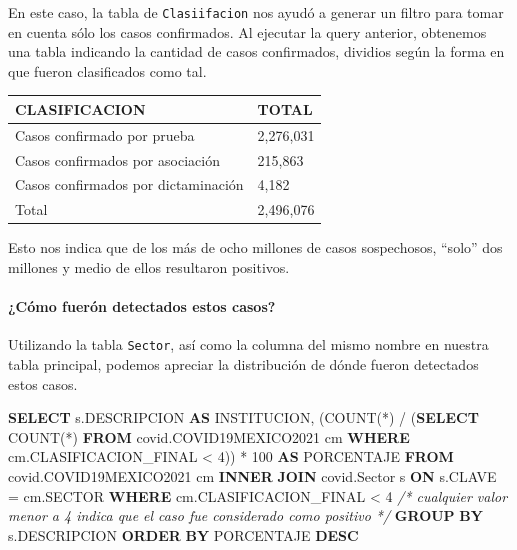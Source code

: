 \documentclass[11pt]{article}
\newenvironment{Shaded}{}{}
\newcommand{\KeywordTok}[1]{\textcolor[rgb]{0.00,0.44,0.13}{\textbf{{#1}}}}
\newcommand{\DecValTok}[1]{\textcolor[rgb]{0.25,0.63,0.44}{{#1}}}
\newcommand{\CommentTok}[1]{\textcolor[rgb]{0.38,0.63,0.69}{\textit{{#1}}}}
\newcommand{\FunctionTok}[1]{\textcolor[rgb]{0.02,0.16,0.49}{{#1}}}
\newcommand{\NormalTok}[1]{{#1}}
\newcommand{\OperatorTok}[1]{\textcolor[rgb]{0.40,0.40,0.40}{{#1}}}
\begin{document}
En este caso, la tabla de \texttt{Clasiifacion} nos ayudó a generar un
filtro para tomar en cuenta sólo los casos confirmados. Al ejecutar la
query anterior, obtenemos una tabla indicando la cantidad de casos
confirmados, dividios según la forma en que fueron clasificados como
tal.

\begin{longtable}[]{@{}ll@{}}
\toprule\noalign{}
CLASIFICACION & TOTAL \\
\midrule\noalign{}
\endhead
\bottomrule\noalign{}
\endlastfoot
Casos confirmado por prueba & 2,276,031 \\
Casos confirmados por asociación & 215,863 \\
Casos confirmados por dictaminación & 4,182 \\
Total & 2,496,076 \\
\end{longtable}

Esto nos indica que de los más de ocho millones de casos sospechosos,
``solo'' dos millones y medio de ellos resultaron positivos.

\hypertarget{cuxf3mo-fueruxf3n-detectados-estos-casos}{%
\paragraph{\texorpdfstring{\textbf{¿Cómo fuerón detectados estos
casos?}}{¿Cómo fuerón detectados estos casos?}}\label{cuxf3mo-fueruxf3n-detectados-estos-casos}}

Utilizando la tabla \texttt{Sector}, así como la columna del mismo
nombre en nuestra tabla principal, podemos apreciar la distribución de
dónde fueron detectados estos casos.

\begin{Shaded}
\begin{Highlighting}[]
\KeywordTok{SELECT}
\NormalTok{    s.DESCRIPCION  }\KeywordTok{AS}\NormalTok{ INSTITUCION,}
\NormalTok{    (}\FunctionTok{COUNT}\NormalTok{(}\OperatorTok{*}\NormalTok{) }\OperatorTok{/}\NormalTok{ (}\KeywordTok{SELECT} \FunctionTok{COUNT}\NormalTok{(}\OperatorTok{*}\NormalTok{) }\KeywordTok{FROM}\NormalTok{ covid.COVID19MEXICO2021 cm }\KeywordTok{WHERE}\NormalTok{ cm.CLASIFICACION\_FINAL }\OperatorTok{\textless{}} \DecValTok{4}\NormalTok{)) }\OperatorTok{*} \DecValTok{100} \KeywordTok{AS}\NormalTok{ PORCENTAJE}
\KeywordTok{FROM} 
\NormalTok{    covid.COVID19MEXICO2021 cm}
\KeywordTok{INNER} \KeywordTok{JOIN} 
\NormalTok{    covid.Sector s  }\KeywordTok{ON}\NormalTok{ s.CLAVE }\OperatorTok{=}\NormalTok{ cm.SECTOR  }
\KeywordTok{WHERE} 
\NormalTok{    cm.CLASIFICACION\_FINAL }\OperatorTok{\textless{}} \DecValTok{4} \CommentTok{/* cualquier valor menor a 4 indica que el caso fue considerado como positivo */}
\KeywordTok{GROUP} \KeywordTok{BY}
\NormalTok{    s.DESCRIPCION }
\KeywordTok{ORDER} \KeywordTok{BY}
\NormalTok{    PORCENTAJE }\KeywordTok{DESC}
\end{Highlighting}
\end{Shaded}
\end{document}
